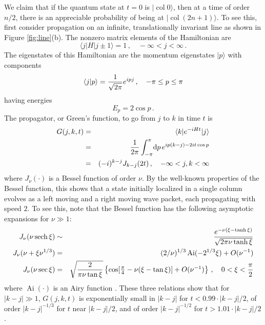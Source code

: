 \documentclass[aps,11pt,twoside,nofootinbib,tightenlines,superscriptaddress,preprintnumbers]{revtex4}
\newcommand{\<}{\langle}
\renewcommand{\>}{\rangle}
\newcommand{\be}{\begin{equation}}
\newcommand{\ee}{\end{equation}}
\newcommand{\bea}{\begin{eqnarray}}
\newcommand{\eea}{\end{eqnarray}}
\renewcommand{\d}{{\mathrm{d}}}
\newcommand{\sech}{\mathop{\mathrm{sech}}\nolimits}
\newcommand{\Ai}{\mathop{\mathrm{Ai}}\nolimits}
\newcommand{\col}{\mathop{\mathrm{col}}\nolimits}
\begin{document}
We claim that if the quantum state at $t=0$ is $|\col 0\>$, then at a time
of order $n/2$, there is an appreciable probability of being at
$|\col(2n+1)\>$.  To see this, first consider propagation on an infinite,
translationally invariant line as shown in Figure \ref{fig:line}(b).  The
nonzero matrix elements of the Hamiltonian are
\be
  \<j|H|j\pm 1\> = 1 \,,\quad -\infty < j < \infty
\,.
\ee
The eigenstates of this Hamiltonian
are the momentum eigenstates $|p\>$ with components
\be
  \<j|p\> = {1 \over \sqrt{2\pi}} e^{i p j}
  \,, \quad -\pi \le p \le \pi
\ee
having energies
\be
  E_p = 2 \cos p 
\,.
\ee
The propagator, or Green's function, to go from $j$ to $k$ in time $t$ is
\bea
\label{eq:green}
  G(j,k,t) &=& \<k|e^{-i H t}|j\> \\
           &=& {1 \over 2 \pi} \int_{-\pi}^\pi \! \d p \, 
	       e^{i p (k-j) - 2 i t \cos p} \\
	   &=& (-i)^{k-j} J_{k-j}(2t) \,,\quad -\infty < j,k < \infty
\eea
where $J_\nu(\cdot)$ is a Bessel function of order $\nu$.  By the
well-known properties of the Bessel function, this shows that a state
initially localized in a single column evolves as a left moving and a
right moving wave packet, each propagating with speed $2$.  To see this,
note that the Bessel function has the following asymptotic expansions for
$\nu \gg 1$:
\bea
  J_\nu(\nu \sech \xi) 
    &\sim& {e^{-\nu(\xi-\tanh \xi)} \over \sqrt{2 \pi \nu \tanh \xi}} 
    \label{eq:besselahead} \\
  J_\nu(\nu+\xi\nu^{1/3}) 
    &=& (2/\nu)^{1/3} \Ai(-2^{1/3}\xi) + O(\nu^{-1})
    \label{eq:besseledge} \\
  J_\nu(\nu \sec \xi)
       &=& \sqrt{2 \over \pi \nu \tan\xi} \left\{
           \cos[\textstyle{\pi \over 4}-\nu(\xi-\tan \xi)] + O(\nu^{-1})
	   \right\}
           \,, \quad 0 < \xi < {\pi \over 2} \label{eq:besselbehind}
\eea
where $\Ai(\cdot)$ is an Airy function \cite{AS72}.  These three relations
show that for $|k-j| \gg 1$, $G(j,k,t)$ is exponentially small in $|k-j|$
for $t <0.99\cdot |k-j|/2$, of order $|k-j|^{-1/3}$ for $t$ near $|k-j|/2$,
and of order $|k-j|^{-1/2}$ for $t >1.01\cdot |k-j|/2$.
\end{document}
